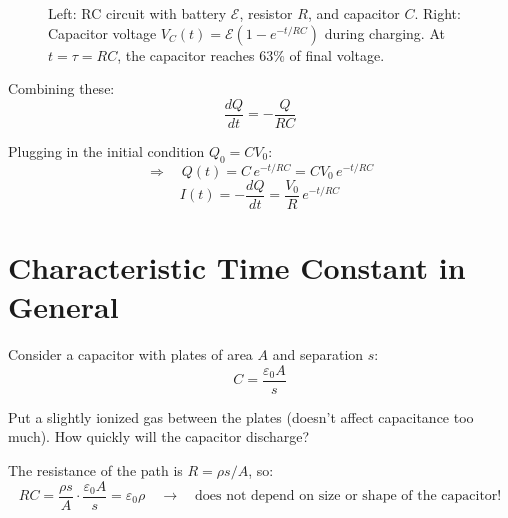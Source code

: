 \begin{figure}[H]
\begin{center}
\hspace{1.5cm}
\end{center}
\caption{Left: RC circuit with battery $\mathcal{E}$, resistor $R$, and capacitor $C$. Right: Capacitor voltage $V_C(t) = \mathcal{E}(1-e^{-t/RC})$ during charging. At $t=\tau=RC$, the capacitor reaches $63\%$ of final voltage.}
\end{figure}

Combining these:
\[
    \frac{dQ}{dt} = -\frac{Q}{RC}
\]

Plugging in the initial condition $Q_0 = CV_0$:
\[
    \Rightarrow\quad Q(t) = C\,e^{-t/RC} = CV_0\,e^{-t/RC}
\]
\[
    I(t) = -\frac{dQ}{dt} = \frac{V_0}{R}\,e^{-t/RC}
\]

\section{Characteristic Time Constant in General}

Consider a capacitor with plates of area $A$ and separation $s$:
\[
    C = \frac{\varepsilon_0 A}{s}
\]

Put a slightly ionized gas between the plates (doesn't affect capacitance too much). How quickly will the capacitor discharge?

The resistance of the path is $R = \rho s / A$, so:
\[
    RC = \frac{\rho s}{A}\cdot\frac{\varepsilon_0 A}{s} = \varepsilon_0\rho
    \quad\to\quad \text{does not depend on size or shape of the capacitor!}
\]

